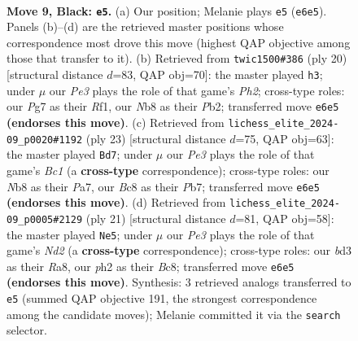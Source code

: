 \documentclass[11pt]{article}
\begin{document}
\clearpage

\begin{figure}[p]\centering
\begin{subfigure}{0.46\textwidth}\centering
\resizebox{\linewidth}{!}{%
\newchessgame
\chessboard[
  setfen={rnbqr1k1/pp3ppp/3bpn2/3p2B1/3P4/3B1N2/PPP2PPP/RN1QK2R b KQ - 0 9},
  showmover=false,
  pgfstyle=straightmove, color=movearrow, markmove={e6-e5}
]}
\caption{}
\end{subfigure}\hfill
\begin{subfigure}{0.46\textwidth}\centering
\resizebox{\linewidth}{!}{%
\newchessgame
\chessboard[
  setfen={rn1q1rk1/p4ppp/5n2/2pp4/1b4b1/2NBPN2/PP1B1PPP/R2Q1RK1 w - - 2 11},
  showmover=false,
  pgfstyle=straightmove, color=movearrow, markmove={h2-h3}
]}
\caption{}
\end{subfigure}
\\[4pt]
\begin{subfigure}{0.46\textwidth}\centering
\resizebox{\linewidth}{!}{%
\newchessgame
\chessboard[
  setfen={r1bq1rk1/pp4pp/2nbpn2/3p2B1/3P4/3B1N2/PP2NPPP/R2Q1RK1 b - - 5 12},
  showmover=false,
  pgfstyle=straightmove, color=movearrow, markmove={c8-d7}
]}
\caption{}
\end{subfigure}\hfill
\begin{subfigure}{0.46\textwidth}\centering
\resizebox{\linewidth}{!}{%
\newchessgame
\chessboard[
  setfen={r1bqr1k1/pppn1pp1/3p1n1p/5B2/1bPN3B/2N1P3/PPQ2PPP/R3K2R b KQ - 0 11},
  showmover=false,
  pgfstyle=straightmove, color=movearrow, markmove={d7-e5}
]}
\caption{}
\end{subfigure}
\caption{\textbf{Move 9, Black: \texttt{e5}.} (a) Our position; Melanie plays \texttt{e5} (\texttt{e6e5}). Panels (b)--(d) are the retrieved master positions whose correspondence most drove this move (highest QAP objective among those that transfer to it). (b) Retrieved from \texttt{twic1500\#386} (ply 20) [structural distance $d$=83, QAP obj=70]: the master played \texttt{h3}; under $\mu$ our \emph{Pe3} plays the role of that game's \emph{Ph2}; cross-type roles: our \emph{P}g7 as their \emph{R}f1, our \emph{N}b8 as their \emph{P}b2; transferred move \texttt{e6e5} \textbf{(endorses this move)}. (c) Retrieved from \texttt{lichess\_elite\_2024-09\_p0020\#1192} (ply 23) [structural distance $d$=75, QAP obj=63]: the master played \texttt{Bd7}; under $\mu$ our \emph{Pe3} plays the role of that game's \emph{Bc1} (a \textbf{cross-type} correspondence); cross-type roles: our \emph{N}b8 as their \emph{P}a7, our \emph{B}c8 as their \emph{P}b7; transferred move \texttt{e6e5} \textbf{(endorses this move)}. (d) Retrieved from \texttt{lichess\_elite\_2024-09\_p0005\#2129} (ply 21) [structural distance $d$=81, QAP obj=58]: the master played \texttt{Ne5}; under $\mu$ our \emph{Pe3} plays the role of that game's \emph{Nd2} (a \textbf{cross-type} correspondence); cross-type roles: our \emph{b}d3 as their \emph{R}a8, our \emph{p}h2 as their \emph{B}c8; transferred move \texttt{e6e5} \textbf{(endorses this move)}. Synthesis: 3 retrieved analogs transferred to \texttt{e5} (summed QAP objective 191, the strongest correspondence among the candidate moves); Melanie committed it via the \texttt{search} selector.}
\label{fig:thought-m17}
\end{figure}
\end{document}
